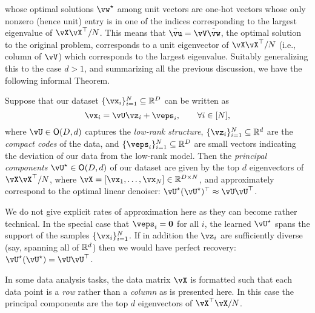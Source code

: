 \documentclass[../../book-main.tex]{subfiles}
\begin{document}
whose optimal solutions \(\vw^{\star}\) among unit vectors are one-hot vectors whose only nonzero (hence unit) entry is in one of the indices corresponding to the largest eigenvalue of \(\vX\vX^{\top}/N\). This means that \(\tilde{\vu} = \vV\tilde{\vw}\), the optimal solution to the original problem, corresponds to a unit eigenvector of \(\vX\vX^{\top}/N\) (i.e., column of \(\vV\)) which corresponds to the largest eigenvalue.  Suitably generalizing this to the case \(d > 1\), and summarizing all the previous discussion, we have the following informal Theorem.
\begin{theorem}\label{thm:pca}
    Suppose that our dataset \(\{\vx_{i}\}_{i = 1}^{N} \subseteq \R^{D}\) can be written as 
    \begin{equation}
        \vx_{i} = \vU\vz_{i} + \veps_{i}, \qquad \forall i \in [N],
    \end{equation}
    where \(\vU \in \O(D, d)\) captures the \textit{low-rank structure},
    \(\{\vz_{i}\}_{i = 1}^{N} \subseteq \R^{d}\) are the \textit{compact codes}
    of the data, and \(\{\veps_{i}\}_{i = 1}^{N} \subseteq \R^{D}\) are small
    vectors indicating the deviation of our data from the low-rank model. Then
    the \textit{principal components} \(\vU^{\star} \in \O(D, d)\) of our
    dataset are given by the top \(d\) eigenvectors of \(\vX\vX^{\top}/N\),
    where \(\vX = [\vx_{1}, \dots, \vx_{N}] \in \R^{D \times N}\), and
    approximately correspond to the optimal linear denoiser:
    \(\vU^{\star}(\vU^{\star})^{\top} \approx \vU\vU^{\top}\).
\end{theorem}
We do not give explicit rates of approximation here as they can become rather
technical. In the special case that \(\veps_{i} = \vzero\) for all \(i\), the
learned \(\vU^{\star}\) spans the support of the samples \(\{\vx_{i}\}_{i
= 1}^{N}\). If in addition the \(\vz_{i}\) are sufficiently diverse (say,
spanning all of \(\mathbb{R}^{d}\)) then we would have perfect recovery:
\(\vU^{\star}(\vU^{\star}) = \vU\vU^{\top}\).


\begin{remark}
    In some data analysis tasks, the data matrix \(\vX\) is formatted such that each data point is a \textit{row} rather than a \textit{column} as is presented here. In this case the principal components are the top \(d\) eigenvectors of \(\vX^{\top}\vX/N\).
\end{remark}
\end{document}
